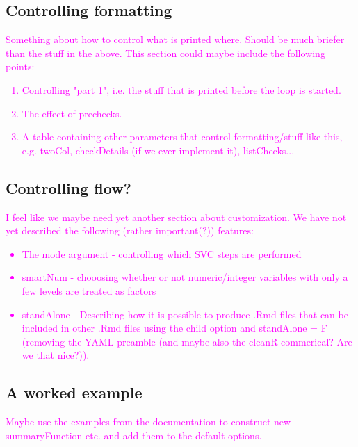 \documentclass[article]{jss}
\newcommand{\hl}[1]{\textcolor{magenta}{#1}}
\begin{document}
\subsection{Controlling formatting}
\hl{Something about how to control what is printed where. Should be much briefer than the stuff in the above. This section could maybe include the following points:
\begin{enumerate}
\item Controlling "part 1", i.e. the stuff that is printed before the loop is started.
\item The effect of prechecks.
\item A table containing other parameters that control formatting/stuff like this, e.g. twoCol, checkDetails (if we ever implement it), listChecks...
\end{enumerate}
}

\subsection{Controlling flow?}
\hl{I feel like we maybe need yet another section about customization. We have not yet described the following (rather important(?)) features:
\begin{itemize}
\item The mode argument - controlling which SVC steps are performed
\item smartNum - chooosing whether or not numeric/integer variables with only a few levels are treated as factors
\item standAlone - Describing how it is possible to produce .Rmd files that can be included in other .Rmd files using the child option and standAlone = F (removing the YAML preamble (and maybe also the cleanR commerical? Are we that nice?)).
\end{itemize}
}

\subsection{A worked example}
\hl{Maybe use the examples from the documentation to construct new summaryFunction etc. and add them to the default options. }
\end{document}
